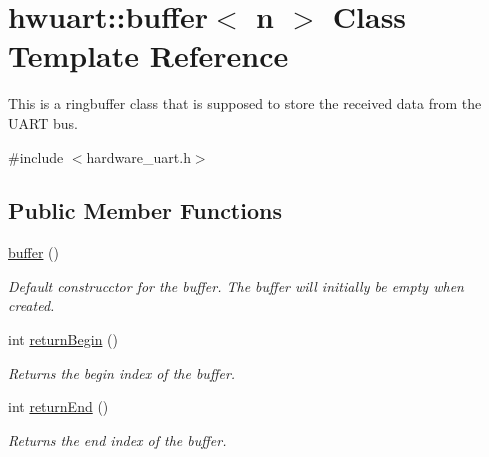 \hypertarget{classhwuart_1_1buffer}{}\section{hwuart\+:\+:buffer$<$ n $>$ Class Template Reference}
\label{classhwuart_1_1buffer}


This is a ringbuffer class that is supposed to store the received data from the U\+A\+RT bus.  




{\ttfamily \#include $<$hardware\+\_\+uart.\+h$>$}

\subsection*{Public Member Functions}
\begin{DoxyCompactItemize}
\item 
\mbox{\label{classhwuart_1_1buffer_aa71598b427cc076787cd12adee9e4c90}} 
\hyperlink{classhwuart_1_1buffer_aa71598b427cc076787cd12adee9e4c90}{buffer} ()
\begin{DoxyCompactList}\small\item\em Default construcctor for the buffer. The buffer will initially be empty when created. \end{DoxyCompactList}\item 
\mbox{\label{classhwuart_1_1buffer_aadb9e6c01b4de3a8c801b55d35988baf}} 
int \hyperlink{classhwuart_1_1buffer_aadb9e6c01b4de3a8c801b55d35988baf}{return\+Begin} ()
\begin{DoxyCompactList}\small\item\em Returns the begin index of the buffer. \end{DoxyCompactList}\item 
\mbox{\label{classhwuart_1_1buffer_a7d015fb50d49061f02034f847c784709}} 
int \hyperlink{classhwuart_1_1buffer_a7d015fb50d49061f02034f847c784709}{return\+End} ()
\begin{DoxyCompactList}\small\item\em Returns the end index of the buffer. \end{DoxyCompactList}\item 
\mbox{\label{classhwuart_1_1buffer_a3d3d0797b0d3c17e1a1903129f6f650e}} 

\end{DoxyCompactItemize}
